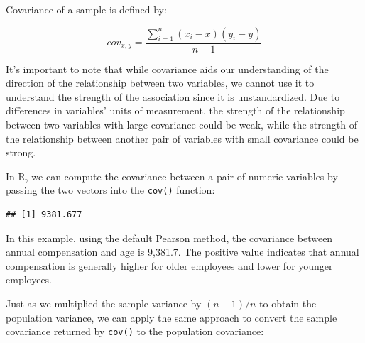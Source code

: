 \documentclass[]{book}
\newenvironment{Shaded}{\begin{snugshade}}{\end{snugshade}}
\newcommand{\CommentTok}[1]{\textcolor[rgb]{0.56,0.35,0.01}{\textit{#1}}}
\newcommand{\DataTypeTok}[1]{\textcolor[rgb]{0.13,0.29,0.53}{#1}}
\newcommand{\DecValTok}[1]{\textcolor[rgb]{0.00,0.00,0.81}{#1}}
\newcommand{\KeywordTok}[1]{\textcolor[rgb]{0.13,0.29,0.53}{\textbf{#1}}}
\newcommand{\NormalTok}[1]{#1}
\newcommand{\OperatorTok}[1]{\textcolor[rgb]{0.81,0.36,0.00}{\textbf{#1}}}
\newcommand{\StringTok}[1]{\textcolor[rgb]{0.31,0.60,0.02}{#1}}
\begin{document}
Covariance of a sample is defined by:

\[ cov_{x,y} = \frac{\displaystyle\sum_{i=1}^{n} (x_{i}-\bar{x})(y_{i}-\bar{y})}{n-1} \]

It's important to note that while covariance aids our understanding of the direction of the relationship between two variables, we cannot use it to understand the strength of the association since it is unstandardized. Due to differences in variables' units of measurement, the strength of the relationship between two variables with large covariance could be weak, while the strength of the relationship between another pair of variables with small covariance could be strong.

In R, we can compute the covariance between a pair of numeric variables by passing the two vectors into the \texttt{cov()} function:

\begin{Shaded}
\end{Shaded}

\begin{verbatim}
## [1] 9381.677
\end{verbatim}

In this example, using the default Pearson method, the covariance between annual compensation and age is 9,381.7. The positive value indicates that annual compensation is generally higher for older employees and lower for younger employees.

Just as we multiplied the sample variance by \((n - 1) / n\) to obtain the population variance, we can apply the same approach to convert the sample covariance returned by \texttt{cov()} to the population covariance:

\begin{Shaded}
\end{Shaded}
\end{document}
